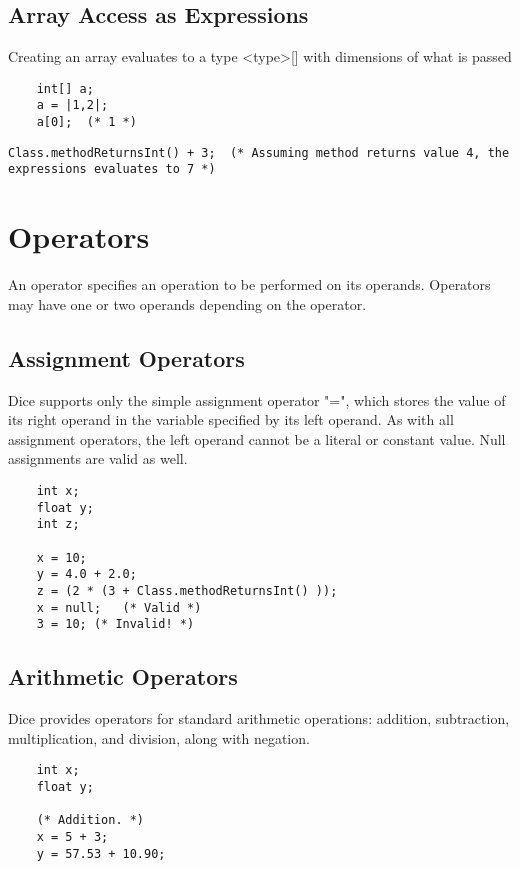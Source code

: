 \begin{homeworkProblem}
	\subsection{Array Access as Expressions}
	Creating an array evaluates to a type \textless type\textgreater[] with dimensions of what is passed
	\begin{verbatim}
	int[] a;
	a = |1,2|;
	a[0];  (* 1 *)
	\end{verbatim}
	
	
	\begin{verbatim}
Class.methodReturnsInt() + 3;  (* Assuming method returns value 4, the expressions evaluates to 7 *)
	\end{verbatim}
	
	\section{Operators}
		
	An operator specifies an operation to be performed on its operands. Operators may have one or two operands depending on the operator. 
	
	\subsection{Assignment Operators}
		
	Dice supports only the simple assignment operator "=", which stores the value of its right operand in the variable specified by its left operand. As with all assignment operators, the left operand cannot be a literal or constant value. Null assignments are valid as well.
		
	\begin{verbatim}
	int x;
	float y;
	int z;

	x = 10;
	y = 4.0 + 2.0;
	z = (2 * (3 + Class.methodReturnsInt() ));
	x = null;   (* Valid *)
	3 = 10; (* Invalid! *)
	\end{verbatim}
	
	\subsection{Arithmetic Operators}
	
	Dice provides operators for standard arithmetic operations: addition, subtraction, multiplication, and division, along with negation.
	
	\begin{verbatim}
	int x;
	float y;

	(* Addition. *)
	x = 5 + 3;   
	y = 57.53 + 10.90;
	

\end{verbatim}
\end{homeworkProblem}
